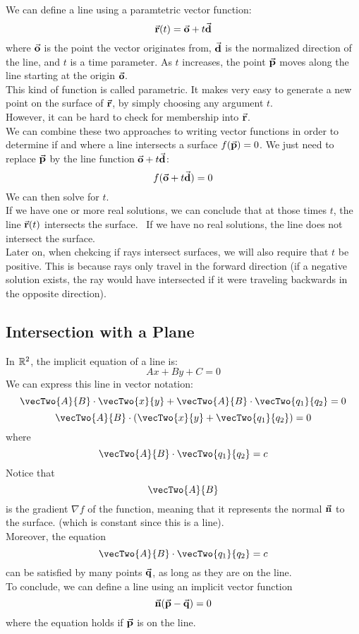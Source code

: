 \documentclass[12pt]{article}
\begin{document}
    We can define a line using a paramtetric
    vector function:
    \[ \vec{\mathbf{r}}(t) = \vec{\mathbf{o}} + t\vec{\mathbf{d}} \]
    where $\vec{\mathbf{o}}$ is the point the vector originates from,
    $\vec{\mathbf{d}}$ is the normalized direction of the line,
    and $t$ is a time parameter.
    As $t$ increases, the point $\vec{\mathbf{p}}$ moves along the
    line starting at the origin $\vec{\mathbf{o}}$. \\

    This kind of function is called parametric.
    It makes very easy to generate a new point
    on the surface of $\vec{\mathbf{r}}$,
    by simply choosing any argument $t$. \\
    However, it can be hard to check for membership
    into $\vec{\mathbf{r}}$. \\

    We can combine these two approaches to writing
    vector functions in order to 
    determine if and where a line intersects
    a surface $f(\vec{\mathbf{p}}) = 0$.
    We just need to replace
    $\vec{\mathbf{p}}$ by the line function $\vec{\mathbf{o}} + t\vec{\mathbf{d}}$:
    \[ f(\vec{\mathbf{o}} + t\vec{\mathbf{d}}) = 0 \]
    We can then solve for $t$. \\

    If we have one or more real solutions,
    we can conclude that at those times $t$,
    the line $\vec{\mathbf{r}}(t)$ intersects the surface. \
    If we have no real solutions,
    the line does not intersect the surface. \\
    
    Later on, when chekcing if rays intersect surfaces,
    we will also require that $t$ be positive.
    This is because rays only travel in the forward
    direction
    (if a negative solution exists,
    the ray would have intersected if it were traveling
    backwards in the opposite direction).

    \newpage

    \subsection*{Intersection with a Plane}

    In $\mathbb{R}^2$, the implicit equation of a line is:
    \[
        Ax + By + C = 0
    \]
    We can express this line in vector
    notation:
    \[ \vecTwo{A}{B} \cdot \vecTwo{x}{y} 
    + \vecTwo{A}{B}  \cdot \vecTwo{q_1}{q_2} = 0 \]
    \[ \vecTwo{A}{B}  \cdot \left( \vecTwo{x}{y}
    + \vecTwo{q_1}{q_2} \right) = 0 \]
    where
    \[ \vecTwo{A}{B} \cdot \vecTwo{q_1}{q_2} = c \]
    Notice that
    \[ \vecTwo{A}{B} \]
    is the gradient $\nabla f$ of the function,
    meaning that it represents the normal $\vec{\mathbf{n}}$
    to the surface.
    (which is constant since this is a line). \\
    Moreover, the equation 
    \[ \vecTwo{A}{B} \cdot \vecTwo{q_1}{q_2} = c \]
    can be satisfied by many points $\vec{\mathbf{q}}$,
    as long as they are on the line. \\
    To conclude, we can define a line
    using an implicit vector function
    \[ \vec{\mathbf{n}}(\vec{\mathbf{p}} - \vec{\mathbf{q}}) = 0 \]
    where the equation holds if $\vec{\mathbf{p}}$
    is on the line. \\
    
\end{document}
